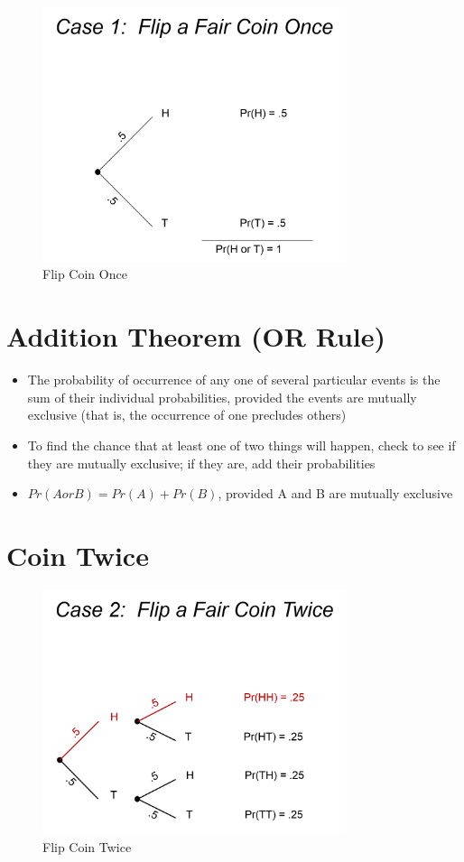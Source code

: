 \documentclass[12pt]{article}
\begin{document}
\begin{figure}[H]
\centering
\includegraphics[width=3.5in]{coin_once.png}
\caption{Flip Coin Once}
\end{figure}

\section{Addition Theorem (OR Rule)}\label{addition-theorem-or-rule}

\begin{itemize}
\itemsep1pt\parskip0pt
\item
  The probability of occurrence of any one of several particular events
  is the sum of their individual probabilities, provided the events are
  mutually exclusive (that is, the occurrence of one precludes others)
\item
  To find the chance that at least one of two things will happen, check
  to see if they are mutually exclusive; if they are, add their
  probabilities
\item
  \(Pr(A or B) = Pr(A) + Pr(B)\), provided A and B are mutually
  exclusive
\end{itemize}

\section{Coin Twice}\label{coin-twice}

\begin{figure}[H]
\centering
\includegraphics[width=3.5in]{coin_twice.png}
\caption{Flip Coin Twice}
\end{figure}
\end{document}
